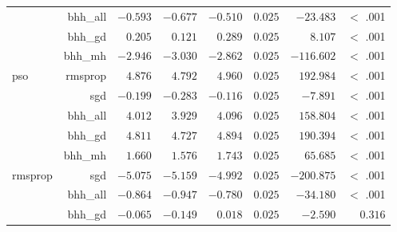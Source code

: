 \begin{table}[H]
{\begin{tabular}{lrrrrrrr}
			                     & bhh\_all             & $-0.593$             & $-0.677$                                        & $-0.510$             & $0.025$              & $-23.483$            & $<$ .001    \\
			                     & bhh\_gd              & $0.205$              & $0.121$                                         & $0.289$              & $0.025$              & $8.107$              & $<$ .001    \\
			                     & bhh\_mh              & $-2.946$             & $-3.030$                                        & $-2.862$             & $0.025$              & $-116.602$           & $<$ .001    \\
			pso                  & rmsprop              & $4.876$              & $4.792$                                         & $4.960$              & $0.025$              & $192.984$            & $<$ .001    \\
			$ $                  & sgd                  & $-0.199$             & $-0.283$                                        & $-0.116$             & $0.025$              & $-7.891$             & $<$ .001    \\
			                     & bhh\_all             & $4.012$              & $3.929$                                         & $4.096$              & $0.025$              & $158.804$            & $<$ .001    \\
			                     & bhh\_gd              & $4.811$              & $4.727$                                         & $4.894$              & $0.025$              & $190.394$            & $<$ .001    \\
			                     & bhh\_mh              & $1.660$              & $1.576$                                         & $1.743$              & $0.025$              & $65.685$             & $<$ .001    \\
			rmsprop              & sgd                  & $-5.075$             & $-5.159$                                        & $-4.992$             & $0.025$              & $-200.875$           & $<$ .001    \\
			$ $                  & bhh\_all             & $-0.864$             & $-0.947$                                        & $-0.780$             & $0.025$              & $-34.180$            & $<$ .001    \\
			                     & bhh\_gd              & $-0.065$             & $-0.149$                                        & $0.018$              & $0.025$              & $-2.590$             & $0.316$     \\

\end{tabular}}
\end{table}
